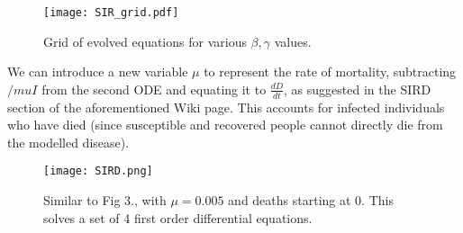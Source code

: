 \documentclass{article}
\begin{document}
\begin{figure}[H]
    \centering
    \texttt{[image: SIR\_grid.pdf]}
    \caption{Grid of evolved equations for various $\beta,\gamma$ values.}
\end{figure}

We can introduce a new variable $\mu$ to represent the rate of mortality, subtracting $/mu I$ from the second ODE and equating it to $\frac{dD}{dt}$, as suggested in the SIRD section of the aforementioned Wiki page. This accounts for infected individuals who have died (since susceptible and recovered people cannot directly die from the modelled disease).

\begin{figure}[H]
    \centering
    \texttt{[image: SIRD.png]}
    \caption{Similar to Fig 3., with $\mu=0.005$ and deaths starting at 0. This solves a set of 4 first order differential equations.}
\end{figure}
\end{document}

